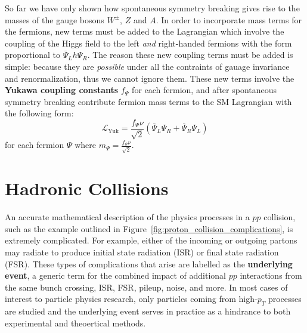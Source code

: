So far we have only shown how spontaneous symmetry breaking gives rise to the masses of the gauge bosons $W^\pm$, $Z$ and $A$.
In order to incorporate mass terms for the fermions, new terms must be added to the Lagrangian which involve the coupling of the Higgs field to the left \textit{and} right-handed fermions with the form proportional to $\bar{\Psi}_L h \Psi_R$.
The reason these new coupling terms must be added is simple: because they are \textit{possible} under all the contraints of gauage invariance and renormalization, thus we cannot ignore them.
These new terms involve the \textbf{Yukawa coupling constants} $f_\Psi$ for each fermion, and after spontaneous symmetry breaking contribute fermion mass terms to the SM Lagrangian with the following form:
\begin{equation}
\mathcal{L}_{\mathrm{Yuk}} = \frac{f_\Psi \nu}{\sqrt{2}} \left( \bar{\Psi}_L \Psi_R + \bar{\Psi}_R \Psi_L \right)
\end{equation}
for each fermion $\Psi$ where $m_\Psi = \frac{f_\Psi \nu}{\sqrt{2}}$.

\section{Hadronic Collisions}
An accurate mathematical description of the physics processes in a $pp$ collision, such as the example outlined in Figure~\ref{fig:proton_collision_complications}, is extremely complicated.
For example, either of the incoming or outgoing partons may radiate to produce initial state radiation (ISR) or final state radiation (FSR).
These types of complications that arise are labelled as the \textbf{underlying event}, a generic term for the combined impact of additional $pp$ interactions from the same bunch crossing, ISR, FSR, pileup, noise, and more.
In most cases of interest to particle physics research, only particles coming from high-$p_T$ processes are studied and the underlying event serves in practice as a hindrance to both experimental and theoertical methods.

